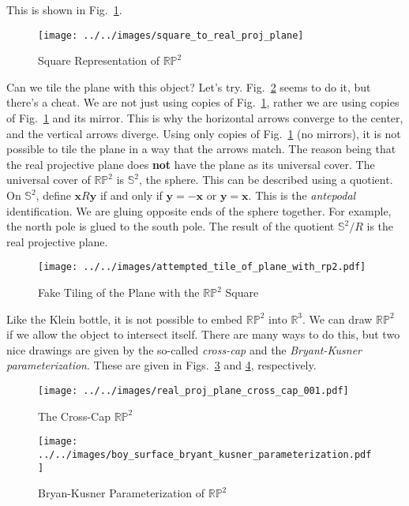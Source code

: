\documentclass{article}
\theoremstyle{plain}
\theoremstyle{normal}
\begin{document}
        This is shown in Fig.~\ref{fig:square_to_real_proj_plane}.
        \begin{figure}
            \centering
            \texttt{[image: ../../images/square\_to\_real\_proj\_plane]}
            \caption{Square Representation of $\mathbb{RP}^{2}$}
            \label{fig:square_to_real_proj_plane}
        \end{figure}
        Can we tile the plane with this object? Let's try.
        Fig.~\ref{fig:attempted_tile_of_plane_with_rp2} seems to do it, but
        there's a cheat. We are not just using copies of
        Fig.~\ref{fig:square_to_real_proj_plane}, rather we are using copies of
        Fig.~\ref{fig:square_to_real_proj_plane} and its mirror. This is why
        the horizontal arrows converge to the center, and the vertical arrows
        diverge. Using only copies of
        Fig.~\ref{fig:square_to_real_proj_plane} (no mirrors), it is not
        possible to tile the plane in a way that the arrows match. The reason
        being that the real projective plane does \textbf{not} have the plane
        as its universal cover. The universal cover of $\mathbb{RP}^{2}$ is
        $\mathbb{S}^{2}$, the sphere. This can be described using a
        quotient. On $\mathbb{S}^{2}$, define
        $\mathbf{x}R\mathbf{y}$ if and only if $\mathbf{y}=-\mathbf{x}$ or
        $\mathbf{y}=\mathbf{x}$. This is
        the \textit{antepodal} identification. We are gluing opposite ends of
        the sphere together. For example, the north pole is glued to the south
        pole. The result of the quotient $\mathbb{S}^{2}/R$ is the real
        projective plane.
        \begin{figure}
            \centering
            \texttt{[image: ../../images/attempted\_tile\_of\_plane\_with\_rp2.pdf]}
            \caption{Fake Tiling of the Plane with the $\mathbb{RP}^{2}$ Square}
            \label{fig:attempted_tile_of_plane_with_rp2}
        \end{figure}
        \par\hfill\par
        Like the Klein bottle, it is not possible to embed
        $\mathbb{RP}^{2}$ into $\mathbb{R}^{3}$. We can draw $\mathbb{RP}^{2}$
        if we allow the object to intersect itself. There are many ways to
        do this, but two nice drawings are given by the so-called
        \textit{cross-cap} and the
        \textit{Bryant-Kusner parameterization}. These are given in
        Figs.~\ref{fig:real_proj_plane_cross_cap_001} and
        \ref{fig:boy_surface_bryant_kusner_parameterization},
        respectively.
        \begin{figure}
            \centering
            \texttt{[image: ../../images/real\_proj\_plane\_cross\_cap\_001.pdf]}
            \caption{The Cross-Cap $\mathbb{RP}^{2}$}
            \label{fig:real_proj_plane_cross_cap_001}
        \end{figure}
        \begin{figure}
            \centering
            \texttt{[image: ../../images/boy\_surface\_bryant\_kusner\_parameterization.pdf]}
            \caption{Bryan-Kusner Parameterization of $\mathbb{RP}^{2}$}
            \label{fig:boy_surface_bryant_kusner_parameterization}
        \end{figure}
\end{document}
